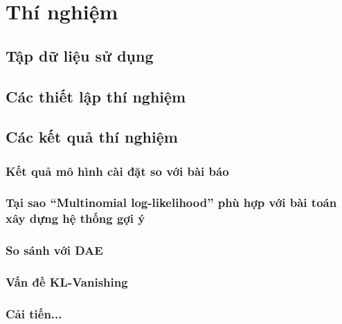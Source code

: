 \chapter{Thí nghiệm}
\label{Chapter4}

\section{Tập dữ liệu sử dụng}

\section{Các thiết lập thí nghiệm}
\section{Các kết quả thí nghiệm}
    \subsection{Kết quả mô hình cài đặt so với bài báo}
    \subsection{Tại sao ``Multinomial log-likelihood'' phù hợp với bài toán xây dựng hệ thống gợi ý}
    \subsection{So sánh với DAE}
    \subsection{Vấn đề KL-Vanishing}
    \subsection{Cải tiến...}
